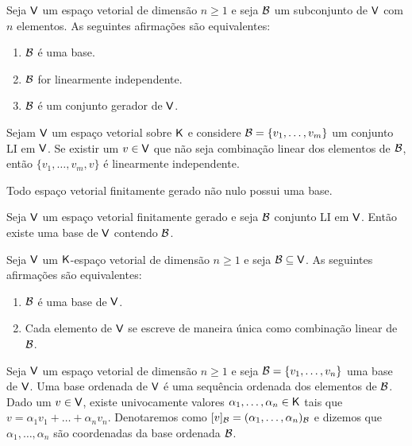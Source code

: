 \documentclass[10pt,a4paper]{book}
\begin{document}
\begin{corollary}
	Seja $\mathsf{ V }$ um espaço vetorial de dimensão $n \geq 1$ e seja $\mathcal{ B }$ um subconjunto de $\mathsf{ V }$ com $n$ elementos. As seguintes afirmações são equivalentes:
	\begin{enumerate}
		\item $\mathcal{ B }$ é uma base.
		\item $\mathcal{ B }$ for linearmente independente.
		\item $\mathcal{ B }$ é um conjunto gerador de $\mathsf{ V }$.
	\end{enumerate}
\end{corollary}

\begin{proposition}
	Sejam $\mathsf{ V }$ um espaço vetorial sobre $\mathsf{ K }$ e considere $\mathcal{ B } = \{ v_1, \dots, v_m \}$ um conjunto LI em $\mathsf{ V }$. Se existir um $v \in \mathsf{ V }$ que não seja combinação linear dos elementos de $\mathcal{ B }$, então $\{ v_1, \dots, v_m, v \}$ é linearmente independente.
\end{proposition}

\begin{theorem}
	Todo espaço vetorial finitamente gerado não nulo possui uma base.
\end{theorem}

\begin{theorem}
	Seja $\mathsf{ V }$ um espaço vetorial finitamente gerado e seja $\mathcal{ B }$ conjunto LI em $\mathsf{ V }$. Então existe uma base de $\mathsf{ V }$ contendo $\mathcal{ B }$.
\end{theorem}

\begin{proposition}
	Seja $\mathsf{ V }$ um $\mathsf{ K }$-espaço vetorial de dimensão $n \geq 1$ e seja $\mathcal{ B } \subseteq \mathsf{ V }$. As seguintes afirmações são equivalentes:
	\begin{enumerate}
		\item $\mathcal{ B }$ é uma base de $\mathsf{ V }$.
		\item Cada elemento de $\mathsf{ V }$ se escreve de maneira única como combinação linear de $\mathcal{ B }$.
	\end{enumerate}
\end{proposition}

\begin{definition}
	Seja $\mathsf{ V }$ um espaço vetorial de dimensão $n \geq 1$ e seja $\mathcal{ B } = \{ v_1, \dots, v_n \}$ uma base de $\mathsf{ V }$. Uma base ordenada de $\mathsf{ V }$ é uma sequência ordenada dos elementos de $\mathcal{ B }$. Dado um $v \in \mathsf{ V }$, existe univocamente valores $\alpha_1, \dots, \alpha_n \in \mathsf{ K }$ tais que $v = \alpha_1 v_1 + \dots + \alpha_n v_n$. Denotaremos como $[v]_{\mathcal{ B }} = (\alpha_1, \dots, \alpha_n)_{\mathcal{ B }}$ e dizemos que $\alpha_1, \dots, \alpha_n$ são coordenadas da base ordenada $\mathcal{ B }$.
\end{definition}
\end{document}
